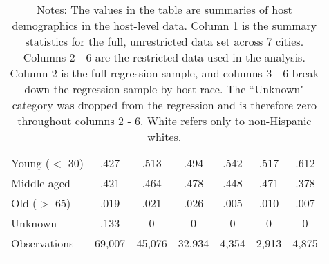 {\begin{longtable}{l*{6}{c}}
		\hspace{3mm}Young ($<$ 30)     &.427  &      .513    & .494      &  .542   &      .517    &    .612  \\
		\hspace{3mm}Middle-aged     & .421   &      .464   &   .478      &    .448    &      .471   &      .378 \\
		\hspace{3mm}Old ($>$ 65)     & .019   &      .021   &    .026    &       .005   &      .010    &      .007	\\
		\hspace{3mm}Unknown    &  .133   &   0     &    0    &       0     &      0     &      0 	\\
		[1em]

		
		\hline
		Observations    &69,007  & 45,076   &       32,934      &    4,354       &     2,913    &      4,875       \\
		\hline\hline
		\caption*{Notes: The values in the table are summaries of host demographics in the host-level data. Column 1 is the summary statistics for the full, unrestricted data set across 7 cities. Columns 2 - 6 are the restricted data used in the analysis. Column 2 is the full regression sample, and columns 3 - 6 break down the regression sample by host race. The ``Unknown" category was dropped from the regression and is therefore zero throughout columns 2 - 6. White refers only to non-Hispanic whites.}
		
	\end{longtable}
}

